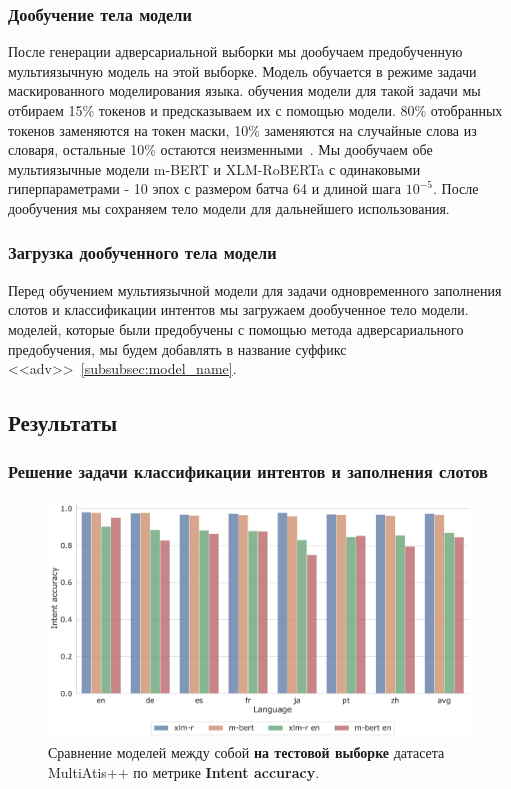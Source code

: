 \subsubsection{Дообучение тела модели}
После генерации адверсариальной выборки мы дообучаем предобученную мультиязычную модель на этой выборке.
Модель обучается в режиме задачи маскированного моделирования языка.
 обучения модели для такой задачи мы отбираем 15\% токенов и предсказываем их с помощью модели.
80\% отобранных токенов заменяются на токен маски, 10\% заменяются на случайные слова из словаря, остальные 10\% остаются неизменными~\cite{devlin-etal-2019-bert}.
Мы дообучаем обе мультиязычные модели m-BERT и XLM-RoBERTa с одинаковыми гиперпараметрами - 10 эпох с размером батча 64 и длиной шага $10^{-5}$.
После дообучения мы сохраняем тело модели для дальнейшего использования.

\subsubsection{Загрузка дообученного тела модели}
Перед обучением мультиязычной модели для задачи одновременного заполнения слотов и классификации интентов мы загружаем дообученное тело модели.
 моделей, которые были предобучены с помощью метода адверсариального предобучения, мы будем добавлять в название суффикс <<adv>>~\eqref{subsubsec:model_name}.

\newpage

\subsection{Результаты}

\subsubsection{Решение задачи классификации интентов и заполнения слотов}

\begin{figure}[H]
    \centering
    \includegraphics[width=\textwidth]{images/0}
    \caption{Сравнение моделей между собой \textbf{на тестовой выборке} датасета MultiAtis++ по метрике \textbf{Intent accuracy}.}\label{fig:figure0}
\end{figure}

